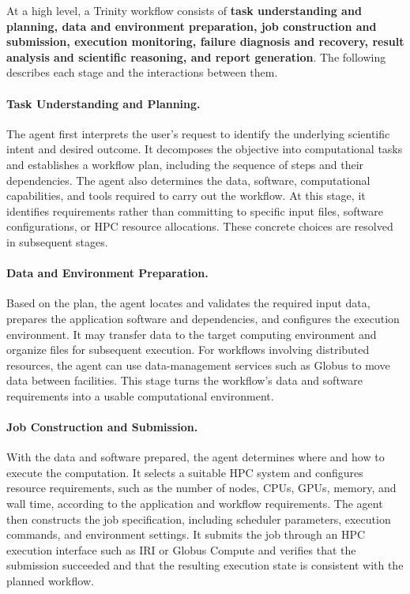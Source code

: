 \documentclass[conference]{IEEEtran}
\begin{document}
At a high level, a Trinity workflow consists of
\textbf{task understanding and planning, data and environment
preparation, job construction and submission, execution
monitoring, failure diagnosis and recovery, result analysis and
scientific reasoning, and report generation}. The following
describes each stage and the interactions between them.

\paragraph{Task Understanding and Planning.}
The agent first interprets the user's request to identify the
underlying scientific intent and desired outcome. It decomposes
the objective into computational tasks and establishes a workflow
plan, including the sequence of steps and their dependencies.
The agent also determines the data, software, computational
capabilities, and tools required to carry out the workflow.
At this stage, it identifies requirements rather than committing
to specific input files, software configurations, or HPC resource
allocations. These concrete choices are resolved in subsequent
stages.

\paragraph{Data and Environment Preparation.}
Based on the plan, the agent locates and validates the required
input data, prepares the application software and dependencies,
and configures the execution environment. It may transfer data
to the target computing environment and organize files for
subsequent execution. For workflows involving distributed
resources, the agent can use data-management services such as
Globus to move data between facilities. This stage turns the
workflow's data and software requirements into a usable
computational environment.

\paragraph{Job Construction and Submission.}
With the data and software prepared, the agent determines where
and how to execute the computation. It selects a suitable HPC
system and configures resource requirements, such as the number
of nodes, CPUs, GPUs, memory, and wall time, according to the
application and workflow requirements. The agent then constructs
the job specification, including scheduler parameters, execution
commands, and environment settings. It submits the job through
an HPC execution interface such as IRI or Globus Compute and
verifies that the submission succeeded and that the resulting
execution state is consistent with the planned workflow.
\end{document}
